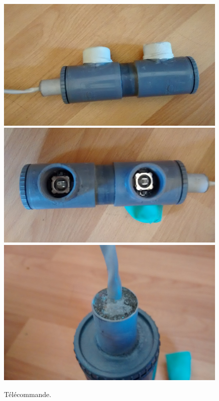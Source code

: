 \documentclass[11pt,a4paper]{article}
\begin{document}
        \begin{figure}[H]
          \centering
          \includegraphics[scale=0.15]{ROVReelTelecommande.jpg}
          \includegraphics[scale=0.15]{ROVReelTelecommandeJoysticks.jpg}
          \includegraphics[scale=0.15]{ROVReelTelecommandeTube.jpg}
          \caption{Télécommande.}
          \label{figTelecommande}
        \end{figure}
        
\end{document}
